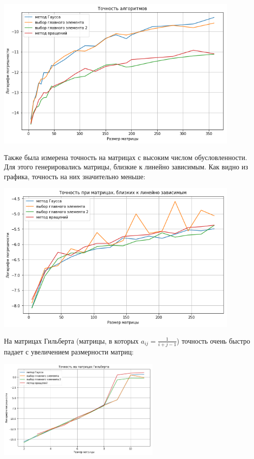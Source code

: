 \documentclass{article}
\begin{document}
\includegraphics[width=0.9\textwidth]{gr_acc_good.png}

Также была измерена точность на матрицах с высоким числом обусловленности. Для этого генерировались матрицы, близкие к линейно зависимым.
Как видно из графика, точность на них значительно меньше:

\includegraphics[width=0.9\textwidth]{gr_acc_bad.png}

На матрицах Гильберта (матрицы, в которых $a_{ij} = \frac{1}{i + j - 1}$) точность очень быстро падает с увеличением размерности матриц:

\includegraphics[width=0.6\textwidth]{hilb.png}
\end{document}
